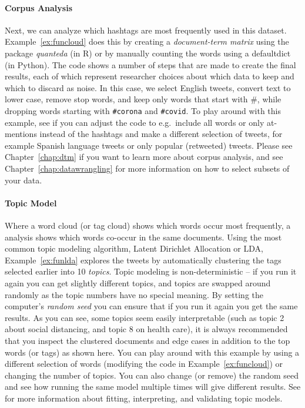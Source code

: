 \paragraph{Corpus Analysis} Next, we can analyze which hashtags are most frequently used in this dataset.
Example~\ref{ex:funcloud} does this by creating a \emph{document-term matrix} using the package \emph{quanteda} (in R)
or by manually counting the words using a defaultdict (in Python).
The code shows a number of steps that are made to create the final results, each of which represent
researcher choices about which data to keep and which to discard as noise.
In this case,  we select English tweets, convert text to lower case,  remove stop words, and keep only words that start with \#,
while dropping words starting with \verb+#corona+ and \verb+#covid+.
To play around with this example,
see if you can adjust the code to e.g.\ include all words or only at-mentions instead of the hashtags
and make a different selection of tweets, for example Spanish language tweets or only popular (retweeted) tweets.
Please see Chapter~\ref{chap:dtm} if you want to learn more about corpus analysis,
and see Chapter~\ref{chap:datawrangling} for more information on how to select subsets of your data.


\paragraph{Topic Model}
Where a word cloud (or tag cloud) shows which words occur most frequently,
a  analysis shows which words co-occur in the same documents.
Using the most common topic modeling algorithm, Latent Dirichlet Allocation or LDA,
Example~\ref{ex:funlda} explores the tweets by automatically clustering the tags selected earlier into 10 \emph{topics}.
Topic modeling is non-deterministic -- if you run it again you can get slightly different topics,
and topics are swapped around randomly as the topic numbers have no special meaning.
By setting the computer's \emph{random seed} you can ensure that if you run it again you get the same results.
As you can see, some topics seem easily interpretable (such as topic 2 about social distancing,
and topic 8 on health care), it is always recommended that you inspect the clustered documents
and edge cases in addition to the top words (or tags) as shown here.
You can play around with this example by using a different selection of words
(modifying the code in Example~\ref{ex:funcloud}) or changing the number of topics.
You can also change (or remove) the random seed and see how running the same model multiple times will give different results. 
See  for more information about fitting, interpreting, and validating topic models.

